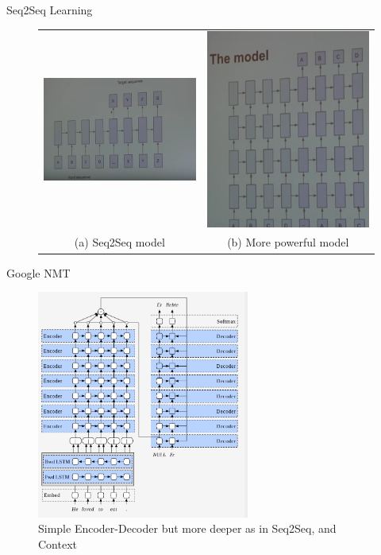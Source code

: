 ﻿\documentclass[aspectratio=43,mathserif,xcolor={usenames,dvipsnames,svgnames,table},10pt]{beamer}
\renewcommand{\footnotesize}{\tiny}
\begin{document}
\begin{frame}{Seq2Seq Learning}
 \begin{figure}
    \centering
    \begin{tabular}{cc}
	\includegraphics[width=.49\linewidth]{images/seq2seq.png} &
	\includegraphics[width=.49\linewidth]{images/seq2seqDeep.png} \\
	\footnotesize(a) Seq2Seq model & \footnotesize(b) More powerful model \\
    \end{tabular}
    \end{figure}
\end{frame}


\begin{frame}{Google NMT}
 \begin{figure}[h]
    \includegraphics[height=7.5cm]{images/gnmt_1.png}  
    \caption{ Simple Encoder-Decoder but more deeper as in Seq2Seq, and Context}
  \end{figure}
\end{frame}
\end{document}
